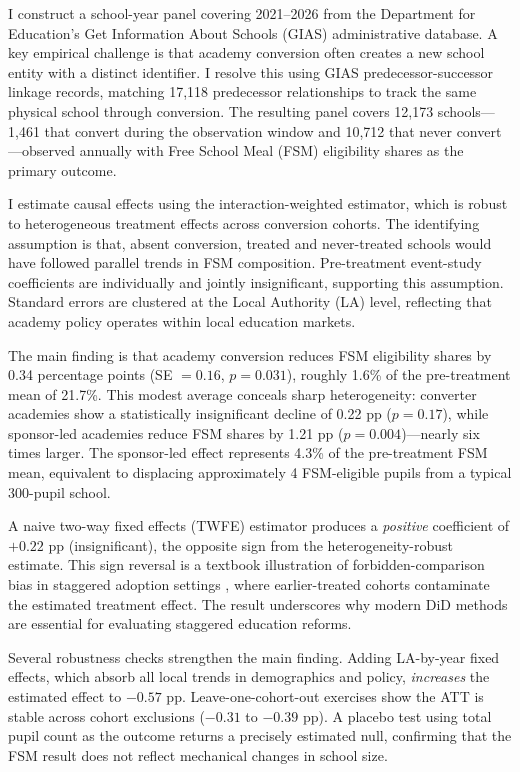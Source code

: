\documentclass[12pt]{article}
\begin{document}
I construct a school-year panel covering 2021--2026 from the Department for Education's Get Information About Schools (GIAS) administrative database. A key empirical challenge is that academy conversion often creates a new school entity with a distinct identifier. I resolve this using GIAS predecessor-successor linkage records, matching 17,118 predecessor relationships to track the same physical school through conversion. The resulting panel covers 12,173 schools---1,461 that convert during the observation window and 10,712 that never convert---observed annually with Free School Meal (FSM) eligibility shares as the primary outcome.

I estimate causal effects using the \citet{sunAbraham2021} interaction-weighted estimator, which is robust to heterogeneous treatment effects across conversion cohorts. The identifying assumption is that, absent conversion, treated and never-treated schools would have followed parallel trends in FSM composition. Pre-treatment event-study coefficients are individually and jointly insignificant, supporting this assumption. Standard errors are clustered at the Local Authority (LA) level, reflecting that academy policy operates within local education markets.

The main finding is that academy conversion reduces FSM eligibility shares by 0.34 percentage points (SE $= 0.16$, $p = 0.031$), roughly 1.6\% of the pre-treatment mean of 21.7\%. This modest average conceals sharp heterogeneity: converter academies show a statistically insignificant decline of 0.22 pp ($p = 0.17$), while sponsor-led academies reduce FSM shares by 1.21 pp ($p = 0.004$)---nearly six times larger. The sponsor-led effect represents 4.3\% of the pre-treatment FSM mean, equivalent to displacing approximately 4 FSM-eligible pupils from a typical 300-pupil school.

A naive two-way fixed effects (TWFE) estimator produces a \textit{positive} coefficient of $+0.22$ pp (insignificant), the opposite sign from the heterogeneity-robust estimate. This sign reversal is a textbook illustration of forbidden-comparison bias in staggered adoption settings \citep{goodmanBacon2021,dechaisemartin2020}, where earlier-treated cohorts contaminate the estimated treatment effect. The result underscores why modern DiD methods are essential for evaluating staggered education reforms.

Several robustness checks strengthen the main finding. Adding LA-by-year fixed effects, which absorb all local trends in demographics and policy, \textit{increases} the estimated effect to $-0.57$ pp. Leave-one-cohort-out exercises show the ATT is stable across cohort exclusions ($-0.31$ to $-0.39$ pp). A placebo test using total pupil count as the outcome returns a precisely estimated null, confirming that the FSM result does not reflect mechanical changes in school size.
\end{document}
